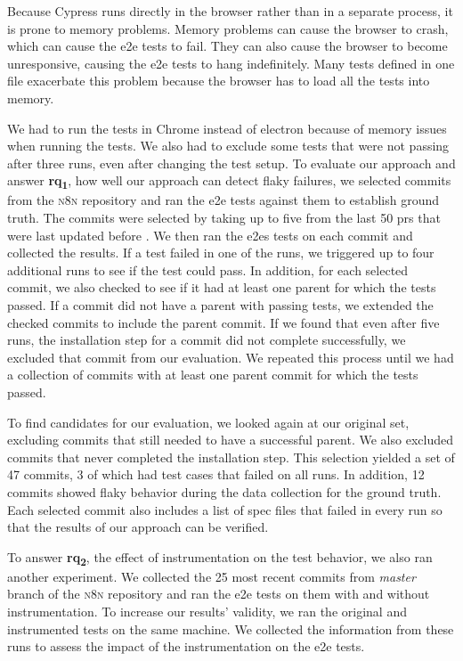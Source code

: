 Because Cypress runs directly in the browser rather than in a separate process, it is prone to memory problems.
Memory problems can cause the browser to crash, which can cause the \ac{e2e} tests to fail.
They can also cause the browser to become unresponsive, causing the \ac{e2e} tests to hang indefinitely.
Many tests defined in one file exacerbate this problem because the browser has to load all the tests into memory.

We had to run the tests in Chrome instead of electron because of memory issues when running the tests.
We also had to exclude some tests that were not passing after three runs, even after changing the test setup.
To evaluate our approach and answer \textbf{\acs{rq}\textsubscript{1}}, how well our approach can detect flaky failures, we selected commits from the \textsc{n8n} repository and ran the \ac{e2e} tests against them to establish ground truth.
The commits were selected by taking up to five from the last 50 \acp{pr} that were last updated before .
We then ran the \acp{e2e} tests on each commit and collected the results.
If a test failed in one of the runs, we triggered up to four additional runs to see if the test could pass.
In addition, for each selected commit, we also checked to see if it had at least one parent for which the tests passed.
If a commit did not have a parent with passing tests, we extended the checked commits to include the parent commit.
If we found that even after five runs, the installation step for a commit did not complete successfully, we excluded that commit from our evaluation.
We repeated this process until we had a collection of commits with at least one parent commit for which the tests passed.

To find candidates for our evaluation, we looked again at our original set, excluding commits that still needed to have a successful parent.
We also excluded commits that never completed the installation step.
This selection yielded a set of 47 commits, 3 of which had test cases that failed on all runs.
In addition, 12 commits showed flaky behavior during the data collection for the ground truth.
Each selected commit also includes a list of spec files that failed in every run so that the results of our approach can be verified.

To answer \textbf{\acs{rq}\textsubscript{2}}, the effect of instrumentation on the test behavior, we also ran another experiment.
We collected the 25 most recent commits from \textit{master} branch of the \textsc{n8n} repository and ran the \ac{e2e} tests on them with and without instrumentation.
To increase our results' validity, we ran the original and instrumented tests on the same machine.
We collected the information from these runs to assess the impact of the instrumentation on the \ac{e2e} tests.

